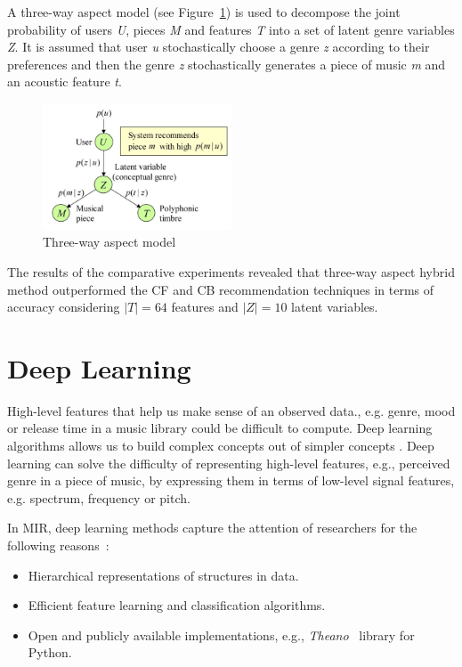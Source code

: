 A three-way aspect model (see Figure~\ref{fig:threeway}) is used to decompose the joint probability of users \emph{U}, pieces \emph{M} and features \emph{T} into a set of latent genre variables \emph{Z}. It is assumed that user \emph{u} stochastically choose a genre \emph{z} according to their preferences and then the genre \emph{z} stochastically generates a piece of music \emph{m} and an acoustic feature \emph{t}.
\begin{figure}[ht!]
	\centering
	\includegraphics[width=0.5\textwidth]{chapter2/three_way_aspect_model.png}
	\caption{Three-way aspect model~\parencite{Yoshii2008435}}
	\label{fig:threeway}
\end{figure}

The results of the comparative experiments revealed that three-way aspect hybrid method outperformed the CF and CB recommendation techniques in terms of  accuracy considering $\vert T\vert=64$ features and $\vert Z\vert=10$ latent variables.

\section{Deep Learning}
High-level features that help us make sense of an observed data., e.g. genre, mood or release time in a music library could be difficult to compute. Deep learning algorithms allows us to build complex concepts out of simpler concepts \parencite{Bengio-et-al-2015-Book}. Deep learning can solve the difficulty of representing high-level features, e.g., perceived genre in a piece of music, by expressing them in terms of low-level signal features, e.g. spectrum, frequency or pitch.

In MIR, deep learning methods capture the attention of researchers for the following reasons~\parencite{kereliuk15}:
\begin{itemize}
	\item Hierarchical representations of structures in data.
	\item Efficient feature learning and classification algorithms.
	\item Open and publicly available implementations, e.g., \textit{Theano}~\parencite{Bastien-Theano-2012, bergstra+al:2010-scipy} library for Python.
\end{itemize}

